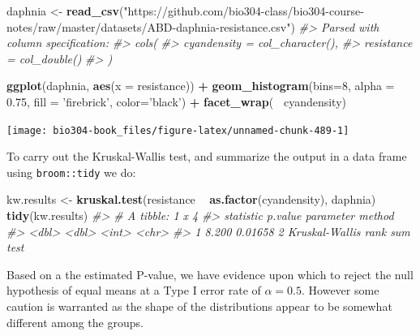 \documentclass[]{book}
\newenvironment{Shaded}{\begin{snugshade}}{\end{snugshade}}
\newcommand{\CommentTok}[1]{\textcolor[rgb]{0.56,0.35,0.01}{\textit{#1}}}
\newcommand{\DataTypeTok}[1]{\textcolor[rgb]{0.13,0.29,0.53}{#1}}
\newcommand{\DecValTok}[1]{\textcolor[rgb]{0.00,0.00,0.81}{#1}}
\newcommand{\FloatTok}[1]{\textcolor[rgb]{0.00,0.00,0.81}{#1}}
\newcommand{\KeywordTok}[1]{\textcolor[rgb]{0.13,0.29,0.53}{\textbf{#1}}}
\newcommand{\NormalTok}[1]{#1}
\newcommand{\OperatorTok}[1]{\textcolor[rgb]{0.81,0.36,0.00}{\textbf{#1}}}
\newcommand{\StringTok}[1]{\textcolor[rgb]{0.31,0.60,0.02}{#1}}
\theoremstyle{definition}
\theoremstyle{definition}
\theoremstyle{definition}
\theoremstyle{remark}
\begin{document}
\begin{Shaded}
\begin{Highlighting}[]
\NormalTok{daphnia <-}\StringTok{ }\KeywordTok{read_csv}\NormalTok{(}\StringTok{"https://github.com/bio304-class/bio304-course-notes/raw/master/datasets/ABD-daphnia-resistance.csv"}\NormalTok{)}
\CommentTok{#> Parsed with column specification:}
\CommentTok{#> cols(}
\CommentTok{#>   cyandensity = col_character(),}
\CommentTok{#>   resistance = col_double()}
\CommentTok{#> )}

\KeywordTok{ggplot}\NormalTok{(daphnia, }\KeywordTok{aes}\NormalTok{(}\DataTypeTok{x =}\NormalTok{ resistance)) }\OperatorTok{+}\StringTok{ }
\StringTok{  }\KeywordTok{geom_histogram}\NormalTok{(}\DataTypeTok{bins=}\DecValTok{8}\NormalTok{, }\DataTypeTok{alpha =} \FloatTok{0.75}\NormalTok{, }\DataTypeTok{fill =} \StringTok{'firebrick'}\NormalTok{, }\DataTypeTok{color=}\StringTok{'black'}\NormalTok{) }\OperatorTok{+}\StringTok{ }
\StringTok{  }\KeywordTok{facet_wrap}\NormalTok{(}\OperatorTok{~}\StringTok{ }\NormalTok{cyandensity)}
\end{Highlighting}
\end{Shaded}

\begin{center}\texttt{[image: bio304-book\_files/figure-latex/unnamed-chunk-489-1]} \end{center}

To carry out the Kruskal-Wallis test, and summarize the output in a data
frame using \texttt{broom::tidy} we do:

\begin{Shaded}
\begin{Highlighting}[]
\NormalTok{kw.results <-}\StringTok{ }\KeywordTok{kruskal.test}\NormalTok{(resistance }\OperatorTok{~}\StringTok{ }\KeywordTok{as.factor}\NormalTok{(cyandensity), daphnia)}
\KeywordTok{tidy}\NormalTok{(kw.results)}
\CommentTok{#> # A tibble: 1 x 4}
\CommentTok{#>   statistic p.value parameter method                      }
\CommentTok{#>       <dbl>   <dbl>     <int> <chr>                       }
\CommentTok{#> 1     8.200 0.01658         2 Kruskal-Wallis rank sum test}
\end{Highlighting}
\end{Shaded}

Based on a the estimated P-value, we have evidence upon which to reject
the null hypothesis of equal means at a Type I error rate of
\(\alpha = 0.5\). However some caution is warranted as the shape of the
distributions appear to be somewhat different among the groups.
\end{document}
